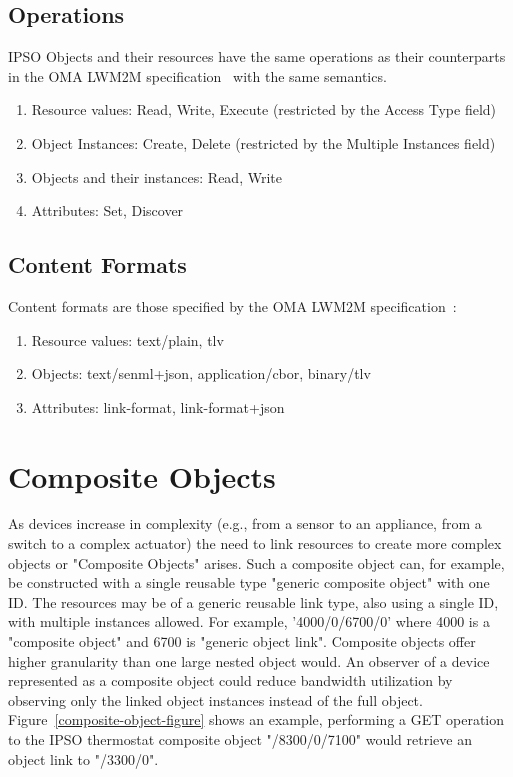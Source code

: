 \documentclass[peerreview, a4paper, 7pt]{IEEEtran}
\begin{document}
\subsection{Operations}

IPSO Objects and their resources have the same operations as their counterparts in the OMA LWM2M specification~\cite{lwm2m} with the same semantics.

\begin{enumerate}
\item Resource values: Read, Write, Execute (restricted by the Access Type field)
\item Object Instances: Create, Delete (restricted by the Multiple Instances field)
\item Objects and their instances: Read, Write
\item Attributes: Set, Discover
\end{enumerate}

\subsection{Content Formats}

Content formats are those specified by the OMA LWM2M specification~\cite{lwm2m}:
\begin{enumerate}
\item Resource values: text/plain, tlv
\item Objects: text/senml+json, application/cbor, binary/tlv
\item Attributes: link-format, link-format+json
\end{enumerate}


\section{Composite Objects}

As devices increase in complexity (e.g., from a sensor to an appliance, from a switch to a complex actuator) the need to link resources to create more complex objects or "Composite Objects" arises. Such a composite object can, for example, be constructed with a single reusable type "generic composite object" with one ID. The resources may be of a generic reusable link type, also using a single ID, with multiple instances allowed. For example, '4000/0/6700/0' where 4000 is a "composite object" and 6700 is "generic object link". Composite objects offer higher granularity than one large nested object would. An observer of a device represented as a composite object could reduce bandwidth utilization by observing only the linked object instances instead of the full object. Figure~\ref{composite-object-figure} shows an example, performing a GET operation to the IPSO thermostat composite object "/8300/0/7100" would retrieve an object link to "/3300/0".
\end{document}
